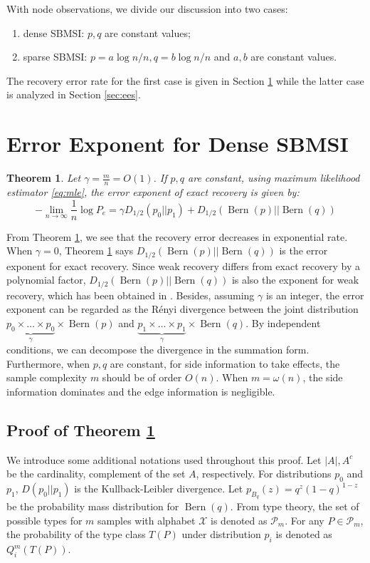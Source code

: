 \documentclass[conference,letterpaper]{IEEEtran}
\newtheorem{theorem}{Theorem}
\DeclareMathOperator{\Bern}{Bern}
\begin{document}
With node observations, we divide our discussion into two cases:
\begin{enumerate}
	\item dense SBMSI: $p,q$ are constant values;
\item sparse SBMSI: $p = a \log n /n, q = b \log n / n$ and $a,b$ are constant values.
\end{enumerate}
The recovery error rate for the first case is given in Section \ref{sec:ee} while
the latter case is analyzed in Section \ref{sec:ees}.
\section{Error Exponent for Dense SBMSI}\label{sec:ee}
\begin{theorem}\label{thm:constant}
	Let $\gamma = \frac{m}{n} = O(1)$. If $p,q$ are constant, using maximum likelihood estimator \eqref{eq:mle},
	the error exponent of exact recovery is given by:
	\begin{equation}
	-\lim_{n\to \infty} \frac{1}{n}\log P_e =  \gamma D_{1/2}(p_0 || p_1) + D_{1/2}(\Bern(p)||\Bern(q))
	\end{equation} 
\end{theorem}
From Theorem \ref{thm:constant}, we see that the recovery error decreases in exponential rate.
When $\gamma=0$, Theorem \ref{thm:constant} says $D_{1/2}(\Bern(p)||\Bern(q))$
is the error exponent for exact recovery. Since weak recovery differs from exact recovery by a polynomial factor, $D_{1/2}(\Bern(p)||\Bern(q))$ is also the exponent for weak recovery, which has been obtained
in \cite{zhang2016}.
Besides, assuming $\gamma$ is an integer, the error exponent can be regarded as the Rényi divergence between the joint distribution
$\underbrace{p_0\times \dots \times p_0}_{\gamma} \times \Bern(p)$ and $\underbrace{p_1\times \dots \times p_1}_{\gamma} \times \Bern(q)$. By independent conditions, we can decompose the
divergence in the summation form.
Furthermore, when $p,q$ are constant, for side information to take effects, the sample complexity $m$ should be of order $O(n)$. When $m=\omega(n)$, the side information dominates and the edge information is negligible.

\subsection{Proof of Theorem \ref{thm:constant}}
We introduce some additional notations used throughout this proof. Let 
$|A|, A^c$ be the cardinality, complement of the set $A$, respectively. For distributions $p_0$ and $p_1$,
$D(p_0 || p_1)$ is the Kullback-Leibler divergence.
 Let
$p_{B_q}(z) = q^z(1-q)^{1-z}$ be the probability mass distribution for $\Bern(q)$.
From type theory, the set of possible types
for $m$ samples with alphabet $\mathcal{X}$ is denoted as $\mathcal{P}_m$. For any $P\in \mathcal{P}_m$, the probability of the type
class $T(P)$ under distribution $p_i$ is denoted as $Q_i^{m}(T(P))$.
\end{document}

